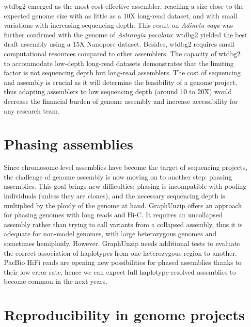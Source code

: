 wtdbg2 emerged as the most cost-effective assembler, reaching a size close to the expected genome size with as little as a 10X long-read dataset, and with small variations with increasing sequencing depth. This result on \textit{Adineta vaga} was further confirmed with the genome of \textit{Astrangia poculata}: wtdbg2 yielded the best draft assembly using a 15X Nanopore dataset. Besides, wtdbg2 requires small computational resources compared to other assemblers. The capacity of wtdbg2 to accommodate low-depth long-read datasets demonstrates that the limiting factor is not sequencing depth but long-read assemblers. The cost of sequencing and assembly is crucial as it will determine the feasibility of a genome project, thus adapting assemblers to low sequencing depth (around 10 to 20X) would decrease the financial burden of genome assembly and increase accessibility for any research team. \\

\section{Phasing assemblies}

Since chromosome-level assemblies have become the target of sequencing projects, the challenge of genome assembly is now moving on to another step: phasing assemblies. This goal brings new difficulties: phasing is incompatible with pooling individuals (unless they are clones), and the necessary sequencing depth is multiplied by the ploidy of the genome at hand. GraphUnzip offers an approach for phasing genomes with long reads and Hi-C. It requires an uncollapsed assembly rather than trying to call variants from a collapsed assembly, thus it is adequate for non-model genomes, with large heterozygous genomes and sometimes hemiploidy. However, GraphUnzip needs additional tests to evaluate the correct association of haplotypes from one heterozygous region to another. PacBio HiFi reads are opening new possibilities for phased assemblies thanks to their low error rate, hence we can expect full haplotype-resolved assemblies to become common in the next years. \\

\section{Reproducibility in genome projects}

